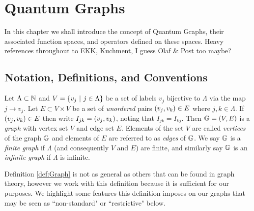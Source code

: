 \chapter{Quantum Graphs} \label{ch:QuantumGraphs}
In this chapter we shall introduce the concept of Quantum Graphs, their associated function spaces, and operators defined on these spaces.
Heavy references throughout to EKK, Kuchment, I guess Olaf \& Post too maybe?

\section{Notation, Definitions, and Conventions} \label{sec:QG-Notation}
\begin{definition}[Graph] \label{def:Graph}
	Let $\Lambda\subset\mathbb{N}$ and $V=\left\{ v_j \ \vert \ j\in\Lambda \right\}$ be a set of labels $v_j$ bijective to $\Lambda$ via the map $j\rightarrow v_j$.
	Let $E\subset V\times V$ be a set of \textit{unordered} pairs $\left( v_j,v_k \right)\in E$ where $j,k\in\Lambda$.
	If $\left( v_j,v_k \right)\in E$ then write $I_{jk} = \left( v_j,v_k \right)$, noting that $I_{jk}=I_{kj}$.
	Then $\mathbb{G}=\left( V,E \right)$ is a \textit{graph} with vertex set $V$ and edge set $E$.
	Elements of the set $V$ are called \textit{vertices} of the graph $\mathbb{G}$ and elements of $E$ are referred to as \textit{edges} of $\mathbb{G}$. \newline
	We say $\mathbb{G}$ is a \textit{finite graph} if $\Lambda$ (and consequently $V$ and $E$) are finite, and similarly say $\mathbb{G}$ is an \textit{infinite graph} if $\Lambda$ is infinite.
\end{definition}
Definition \ref{def:Graph} is not as general as others that can be found in graph theory, however we work with this definition because it is sufficient for our purposes.
We highlight some features this definition imposes on our graphs that may be seen as ``non-standard" or ``restrictive" below.
